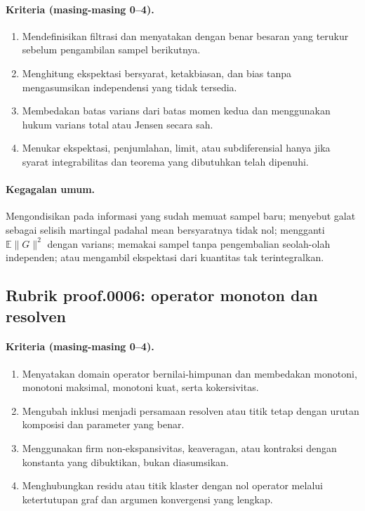 \paragraph{Kriteria (masing-masing 0--4).}
\begin{enumerate}
  \item Mendefinisikan filtrasi dan menyatakan dengan benar besaran yang
  terukur sebelum pengambilan sampel berikutnya.
  \item Menghitung ekspektasi bersyarat, ketakbiasan, dan bias tanpa
  mengasumsikan independensi yang tidak tersedia.
  \item Membedakan batas varians dari batas momen kedua dan menggunakan hukum
  varians total atau Jensen secara sah.
  \item Menukar ekspektasi, penjumlahan, limit, atau subdiferensial hanya jika
  syarat integrabilitas dan teorema yang dibutuhkan telah dipenuhi.
\end{enumerate}

\paragraph{Kegagalan umum.}
Mengondisikan pada informasi yang sudah memuat sampel baru; menyebut galat
sebagai selisih martingal padahal mean bersyaratnya tidak nol; mengganti
$\mathbb E\lVert G\rVert^2$ dengan varians; memakai sampel tanpa pengembalian
seolah-olah independen; atau mengambil ekspektasi dari kuantitas tak
terintegralkan.

\subsection{Rubrik proof.0006: operator monoton dan resolven}
\label{orig03:rubric:proof:0006}

\paragraph{Kriteria (masing-masing 0--4).}
\begin{enumerate}
  \item Menyatakan domain operator bernilai-himpunan dan membedakan monotoni,
  monotoni maksimal, monotoni kuat, serta kokersivitas.
  \item Mengubah inklusi menjadi persamaan resolven atau titik tetap dengan
  urutan komposisi dan parameter yang benar.
  \item Menggunakan firm non-ekspansivitas, keaveragan, atau kontraksi dengan
  konstanta yang dibuktikan, bukan diasumsikan.
  \item Menghubungkan residu atau titik klaster dengan nol operator melalui
  ketertutupan graf dan argumen konvergensi yang lengkap.
\end{enumerate}

